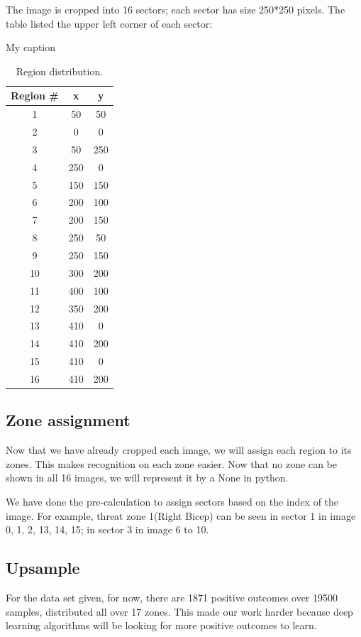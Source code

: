 \documentclass[conference,compsoc]{IEEEtran}
\begin{document}
The image is cropped into 16 sectors; each sector has size 250*250 pixels. The table listed the upper left corner of each sector:
\begin{table}[!htb]
    \centering
    \caption{My caption}
    \label{my-label}
    \begin{tabular}{ccc}
        \hline
        Region \# & x   & y   \\ \hline
        1         & 50  & 50  \\ \hline
        2         & 0   & 0   \\ \hline
        3         & 50  & 250 \\ \hline
        4         & 250 & 0   \\ \hline
        5         & 150 & 150 \\ \hline
        6         & 200 & 100 \\ \hline
        7         & 200 & 150 \\ \hline
        8         & 250 & 50  \\ \hline
        9         & 250 & 150 \\ \hline
        10        & 300 & 200 \\ \hline
        11        & 400 & 100 \\ \hline
        12        & 350 & 200 \\ \hline
        13        & 410 & 0   \\ \hline
        14        & 410 & 200 \\ \hline
        15        & 410 & 0   \\ \hline
        16        & 410 & 200 \\ \hline
    \end{tabular}
    \caption{Region distribution.}
\end{table}
\subsection{Zone assignment}
Now that we have already cropped each image, we will assign each region to its zones. This makes recognition on each zone easier. Now that no zone can be shown in all 16 images, we will represent it by a None in python.

We have done the pre-calculation to assign sectors based on the index of the image. For example, threat zone 1(Right Bicep) can be seen in sector 1 in image 0, 1, 2, 13, 14, 15; in sector 3 in image 6 to 10.

\subsection{Upsample}
For the data set given, for now, there are 1871 positive outcomes over 19500 samples, distributed all over 17 zones. This made our work harder because deep learning algorithms will be looking for more positive outcomes to learn.
\end{document}
